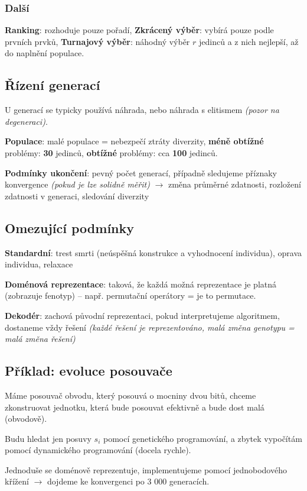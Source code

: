 \subsubsection*{Další}

\textbf{Ranking}: rozhoduje pouze pořadí, \textbf{Zkrácený výběr}: vybírá pouze podle prvních prvků, \textbf{Turnajový výběr}: náhodný výběr $r$ jedinců a z nich nejlepší, až do naplnění populace.

\subsection{Řízení generací}

U generací se typicky používá náhrada, nebo náhrada s elitismem \textit{(pozor na degeneraci)}.

\vspace{4pt}
\noindent \textbf{Populace}: malé populace = nebezpečí ztráty diverzity, \textbf{méně obtížné} problémy: \textbf{30} jedinců, \textbf{obtížné} problémy: cca \textbf{100} jedinců.

\vspace{4pt}
\noindent \textbf{Podmínky ukončení}: pevný počet generací, případně sledujeme příznaky konvergence \textit{(pokud je lze solidně měřit)} $\to$ změna průměrné zdatnosti, rozložení zdatnosti v generaci, sledování diverzity

\subsection{Omezující podmínky}

\textbf{Standardní}: trest smrti (neúspěšná konstrukce a vyhodnocení individua), oprava individua, relaxace

\vspace{4pt}
\noindent \textbf{Doménová reprezentace}: taková, že každá možná reprezentace je platná (zobrazuje fenotyp) -- např. permutační operátory = je to permutace.

\vspace{4pt}
\noindent \textbf{Dekodér}: zachová původní reprezentaci, pokud interpretujeme algoritmem, dostaneme vždy řešení \textit{(každé řešení je reprezentováno, malá změna genotypu = malá změna řešení)}

\subsection{Příklad: evoluce posouvače}

Máme posouvač obvodu, který posouvá o mocniny dvou bitů, chceme zkonstruovat jednotku, která bude posouvat efektivně a bude dost malá (obvodově).

\vspace{4pt}
\noindent Budu hledat jen posuvy $s_i$ pomocí genetického programování, a zbytek vypočítám pomocí dynamického programování (docela rychle).

\vspace{4pt}
\noindent Jednoduše se doménově reprezentuje, implementujeme pomocí jednobodového křížení $\to$ dojdeme ke konvergenci po 3 000 generacích.
